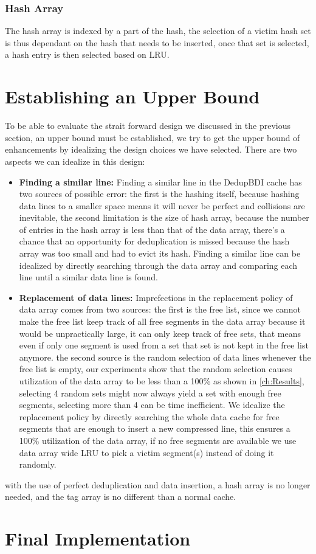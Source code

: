 \subsubsection{Hash Array}
\label{sssec:DedupBDIHash}
The hash array is indexed by a part of the hash, the selection of a victim hash set is thus dependant on the hash that needs to be inserted, once that set is selected, a hash entry is then selected based on LRU.

\section{Establishing an Upper Bound}
\label{sec:Upper Bound}
To be able to evaluate the strait forward design we discussed in the previous section, an upper bound must be established, we try to get the upper bound of enhancements by idealizing the design choices we have selected. There are two aspects we can idealize in this design:
\begin{itemize}
    \item \textbf{Finding a similar line:} Finding a similar line in the DedupBDI cache has two sources of possible error: the first is the hashing itself, because hashing data lines to a smaller space means it will never be perfect and collisions are inevitable, the second limitation is the size of hash array, because the number of entries in the hash array is less than that of the data array, there's a chance that an opportunity for deduplication is missed because the hash array was too small and had to evict its hash. Finding a similar line can be idealized by directly searching through the data array and comparing each line until a similar data line is found.
    \item \textbf{Replacement of data lines:} Imprefections in the replacement policy of data array comes from two sources: the first is the free list, since we cannot make the free list keep track of all free segments in the data array because it would be unpractically large, it can only keep track of free sets, that means even if only one segment is used from a set that set is not kept in the free list anymore. the second source is the random selection of data lines whenever the free list is empty, our experiments show that the random selection causes utilization of the data array to be less than a 100\% as shown in \ref{ch:Results}, selecting 4 random sets might now always yield a set with enough free segments, selecting more than 4 can be time inefficient. We idealize the replacement policy by directly searching the whole data cache for free segments that are enough to insert a new compressed line, this ensures a 100\% utilization of the data array, if no free segments are available we use data array wide LRU to pick a victim segment(s) instead of doing it randomly.
\end{itemize}
with the use of perfect deduplication and data insertion, a hash array is no longer needed, and the tag array is no different than a normal cache.

\section{Final Implementation}
\label{sec:Final Implementation}
